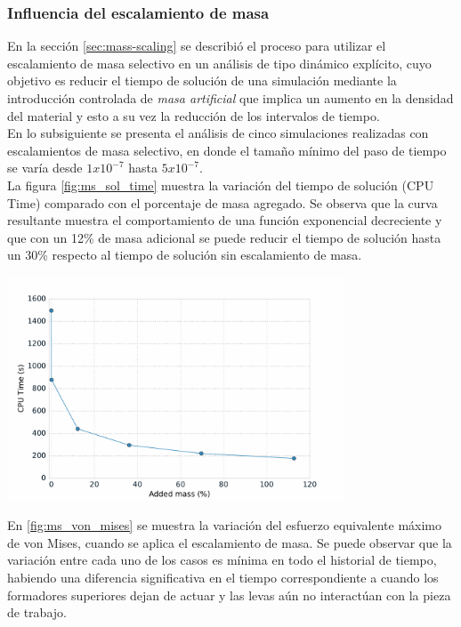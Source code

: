 \subsubsection{Influencia del escalamiento de masa}\label{sec:mass-scaling-results}

En la sección \ref{sec:mass-scaling} se describió el proceso para utilizar el escalamiento de masa 
selectivo en un análisis de tipo dinámico explícito, cuyo objetivo es reducir el tiempo de 
solución de una simulación mediante la introducción controlada de \textit{masa artificial} que implica 
un aumento en la densidad del material y esto a su vez la reducción de los intervalos de tiempo.\\

En lo subsiguiente se presenta el análisis de cinco simulaciones realizadas con escalamientos de 
masa selectivo, en donde el tamaño mínimo del paso de tiempo se varía desde $1x10^{-7}$ hasta 
$5x10^{-7}$.\\

La figura \ref{fig:ms_sol_time} muestra la variación del tiempo de solución (CPU Time) comparado con 
el porcentaje de masa agregado. Se observa que la curva resultante muestra el comportamiento de 
una función exponencial decreciente y que con un 12\% de masa adicional se puede reducir el tiempo 
de solución hasta un 30\% respecto al tiempo de solución sin escalamiento de masa.

\begin{center}
\includegraphics[width=0.75\textwidth]{src/ch4/ms_sol_time.pdf}
\label{fig:ms_sol_time}
\end{center}

En \ref{fig:ms_von_mises} se muestra la variación del esfuerzo equivalente máximo de von Mises, cuando 
se aplica el escalamiento de masa. Se puede observar que la variación entre cada uno de los casos 
es mínima en todo el historial de tiempo, habiendo una diferencia significativa en el tiempo 
correspondiente a cuando los formadores superiores dejan de actuar y las levas aún no interactúan 
con la pieza de trabajo.

